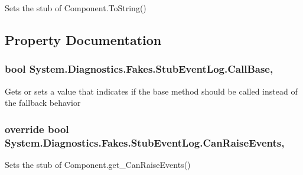 Sets the stub of Component.\-To\-String()



\subsection{Property Documentation}
\hypertarget{class_system_1_1_diagnostics_1_1_fakes_1_1_stub_event_log_ae27b64a019b067838ceafde71cd4a9b6}{
\subsubsection[{Call\-Base}]{\setlength{\rightskip}{0pt plus 5cm}bool System.\-Diagnostics.\-Fakes.\-Stub\-Event\-Log.\-Call\-Base\hspace{0.3cm}{\ttfamily [get]}, {\ttfamily [set]}}}\label{class_system_1_1_diagnostics_1_1_fakes_1_1_stub_event_log_ae27b64a019b067838ceafde71cd4a9b6}


Gets or sets a value that indicates if the base method should be called instead of the fallback behavior

\hypertarget{class_system_1_1_diagnostics_1_1_fakes_1_1_stub_event_log_a3676ce1e63de635038d8f9b0befa7e48}{
\subsubsection[{Can\-Raise\-Events}]{\setlength{\rightskip}{0pt plus 5cm}override bool System.\-Diagnostics.\-Fakes.\-Stub\-Event\-Log.\-Can\-Raise\-Events\hspace{0.3cm}{\ttfamily [get]}, {\ttfamily [protected]}}}\label{class_system_1_1_diagnostics_1_1_fakes_1_1_stub_event_log_a3676ce1e63de635038d8f9b0befa7e48}


Sets the stub of Component.\-get\-\_\-\-Can\-Raise\-Events()


